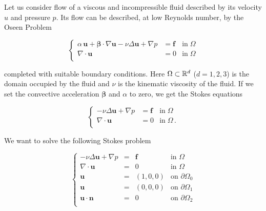 %
%
%
%
%


Let us consider flow of a viscous and incompressible fluid described by its velocity $u$
and pressure $p$. Its flow can be described, at low Reynolds number, by the Oseen Problem 

\begin{equation} \label{eqn-oseen}
\left\{
\begin{array}{lcl}
\displaystyle \alpha\, \bm{u} + \bm{\beta} \cdot \nabla \bm{u} - \nu \Delta \bm{u} +
\nabla p & = \bm{f}& \mbox{in}\; \Omega \\
\displaystyle \nabla \cdot \bm{u} & = 0& \mbox{in}\; \Omega  \\
\end{array}
\right.
\end{equation}

\noindent completed with suitable boundary conditions. Here $\Omega\subset \mathbb{R}^d$ ($d=1, 2, 3$) is the domain occupied by the fluid and $\nu$ is the kinematic viscosity of the fluid. If we set the convective
acceleration $\bm{\beta}$ and $\alpha$ to zero, we get the Stokes equations

\begin{equation} \label{eqn-stokes}
\left\{
\begin{array}{lcl}
- \nu \Delta \bm{u}+
\nabla p & = \bm{f}& \mbox{in}\; \Omega \\
\displaystyle \nabla \cdot \bm{u} & = 0 & \mbox{in}\; \Omega\,. \\
\end{array}
\right.
\end{equation}

We want to solve the following Stokes problem

\begin{equation} \label{eqn-stokes}
\left\{
\begin{array}{llll}
\displaystyle - \nu \Delta \bm{u}+
\nabla p & =& \bm{f} & \mbox{in } \Omega \\
\displaystyle \nabla \cdot \bm{u} & =& 0  & \mbox{in } \Omega \\
\bm{u} & =& (1, 0, 0) & \mbox{on } \partial \Omega_0 \\
\bm{u} & =& (0, 0, 0) & \mbox{on } \partial \Omega_1  \\
\bm{u} \cdot \bm{n} & =& 0 & \mbox {on } \partial \Omega_2\\
\end{array}
\right.
\end{equation}

